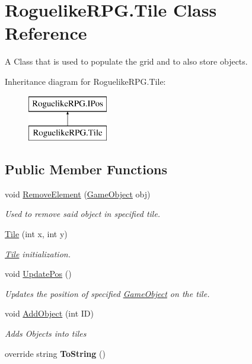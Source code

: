 \hypertarget{class_roguelike_r_p_g_1_1_tile}{}\section{Roguelike\+R\+P\+G.\+Tile Class Reference}
\label{class_roguelike_r_p_g_1_1_tile}


A Class that is used to populate the grid and to also store objects.  


Inheritance diagram for Roguelike\+R\+P\+G.\+Tile\+:\begin{figure}[H]
\begin{center}
\leavevmode
\includegraphics[height=2.000000cm]{class_roguelike_r_p_g_1_1_tile}
\end{center}
\end{figure}
\subsection*{Public Member Functions}
\begin{DoxyCompactItemize}
\item 
void \mbox{\hyperlink{class_roguelike_r_p_g_1_1_tile_a84a16dca9f4ac818eca0eb58f7c5418b}{Remove\+Element}} (\mbox{\hyperlink{class_roguelike_r_p_g_1_1_game_object}{Game\+Object}} obj)
\begin{DoxyCompactList}\small\item\em Used to remove said object in specified tile. \end{DoxyCompactList}\item 
\mbox{\hyperlink{class_roguelike_r_p_g_1_1_tile_ac00f81529ef711a7875d3810749a729d}{Tile}} (int x, int y)
\begin{DoxyCompactList}\small\item\em \mbox{\hyperlink{class_roguelike_r_p_g_1_1_tile}{Tile}} initialization. \end{DoxyCompactList}\item 
void \mbox{\hyperlink{class_roguelike_r_p_g_1_1_tile_a48756f2f22db20e7c765c0d56f5a36f3}{Update\+Pos}} ()
\begin{DoxyCompactList}\small\item\em Updates the position of specified \mbox{\hyperlink{class_roguelike_r_p_g_1_1_game_object}{Game\+Object}} on the tile. \end{DoxyCompactList}\item 
void \mbox{\hyperlink{class_roguelike_r_p_g_1_1_tile_a4540cd9d2fb8989e65778bcffbbe340f}{Add\+Object}} (int ID)
\begin{DoxyCompactList}\small\item\em Adds Objects into tiles \end{DoxyCompactList}\item 
\mbox{\label{class_roguelike_r_p_g_1_1_tile_a495e7ee559a4006f4e845ab348b70333}} 
override string {\bfseries To\+String} ()
\end{DoxyCompactItemize}
